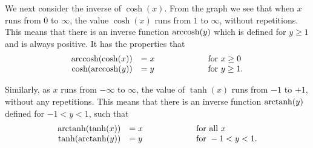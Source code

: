 \documentclass[a4paper]{book}
\theoremstyle{definition}
\begin{document}
We next consider the inverse of $\cosh(x)$.  From the graph we see
that when $x$ runs from $0$ to $\infty$, the value $\cosh(x)$ runs
from $1$ to $\infty$, without repetitions.  This means that there is
an inverse function $\operatorname{arccosh}(y)$ which is defined for $y\geq 1$ and
is always positive.  It has the properties that
\[ \begin{array}{rlll}
 \operatorname{arccosh}(\cosh(x)) &= x & \hspace{4em} & \text{ for } x\geq 0 \\
 \cosh(\operatorname{arccosh}(y)) &= y &              & \text{ for } y\geq 1.
\end{array} \]

Similarly, as $x$ runs from $-\infty$ to $\infty$, the value of
$\tanh(x)$ runs from $-1$ to $+1$, without any repetitions.  This
means that there is an inverse function $\operatorname{arctanh}(y)$ defined for
$-1<y<1$, such that
\[ \begin{array}{rlll}
 \operatorname{arctanh}(\tanh(x)) &= x & \hspace{4em} & \text{ for all } x \\
 \tanh(\operatorname{arctanh}(y)) &= y &              & \text{ for } -1<y<1.
\end{array} \]
\end{document}
